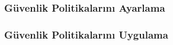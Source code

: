 \subsubsection{Güvenlik Politikalarını Ayarlama}
\lipsum[7] %

\subsubsection{Güvenlik Politikalarını Uygulama}
\lipsum[8] %
